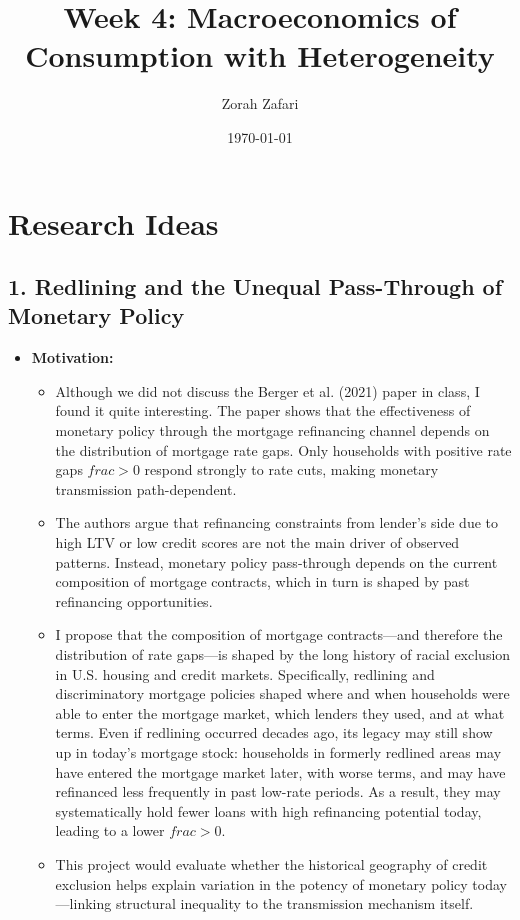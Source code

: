 \documentclass[10pt]{article}
\title{Week 4: Macroeconomics of Consumption with Heterogeneity}
\author{Zorah Zafari}
\date{\today}
\begin{document}
\maketitle

\section*{Research Ideas}
\subsection*{1. Redlining and the Unequal Pass-Through of Monetary Policy}

\begin{itemize}
\item \textbf{Motivation:}
\begin{itemize}
\item Although we did not discuss the Berger et al. (2021) paper in class, I found it quite interesting. The paper shows that the effectiveness of monetary policy through the mortgage refinancing channel depends on the distribution of mortgage rate gaps. Only households with positive rate gaps $frac>0$ respond strongly to rate cuts, making monetary transmission path-dependent.

\item The authors argue that refinancing constraints from lender's side due to high LTV or low credit scores are not the main driver of observed patterns. Instead, monetary policy pass-through depends on the current composition of mortgage contracts, which in turn is shaped by past refinancing opportunities.

\item I propose that the composition of mortgage contracts—and therefore the distribution of rate gaps—is shaped by the long history of racial exclusion in U.S. housing and credit markets. Specifically, redlining and discriminatory mortgage policies shaped where and when households were able to enter the mortgage market, which lenders they used, and at what terms. Even if redlining occurred decades ago, its legacy may still show up in today's mortgage stock: households in formerly redlined areas may have entered the mortgage market later, with worse terms, and may have refinanced less frequently in past low-rate periods. As a result, they may systematically hold fewer loans with high refinancing potential today, leading to a lower $frac>0$.

\item This project would evaluate whether the historical geography of credit exclusion helps explain variation in the potency of monetary policy today—linking structural inequality to the transmission mechanism itself.
\end{itemize}


\end{itemize}
\end{document}
